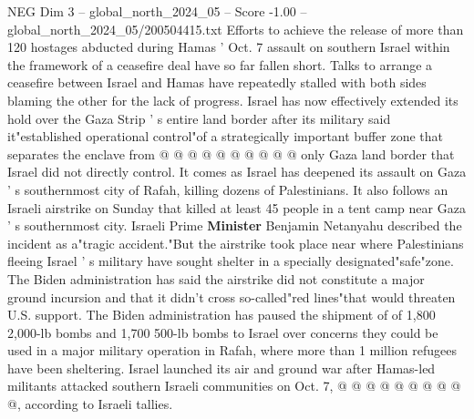 \begin{textsample}{NEG Dim 3 – global\_north\_2024\_05 – Score -1.00 – global\_north\_2024\_05/200504415.txt}
Efforts to achieve the release of more than 120 hostages abducted during Hamas ' Oct. 7 assault on southern Israel within the framework of a ceasefire deal have so far fallen short.
Talks to arrange a ceasefire between Israel and Hamas have repeatedly stalled with both sides blaming the other for the lack of progress.
Israel has now effectively extended its hold over the Gaza Strip ' s entire land border after its military said it"established operational control"of a strategically important buffer zone that separates the enclave from @ @ @ @ @ @ @ @ @ @ only Gaza land border that Israel did not directly control.
It comes as Israel has deepened its assault on Gaza ' s southernmost city of Rafah, killing dozens of Palestinians.
It also follows an Israeli airstrike on Sunday that killed at least 45 people in a tent camp near Gaza ' s southernmost city.
Israeli Prime \textbf{Minister} Benjamin Netanyahu described the incident as a"tragic accident."But the airstrike took place near where Palestinians fleeing Israel ' s military have sought shelter in a specially designated"safe"zone.
The Biden administration has said the airstrike did not constitute a major ground incursion and that it didn't cross so-called"red lines"that would threaten U.S. support.
The Biden administration has paused the shipment of of 1,800 2,000-lb bombs and 1,700 500-lb bombs to Israel over concerns they could be used in a major military operation in Rafah, where more than 1 million refugees have been sheltering.
Israel launched its air and ground war after Hamas-led militants attacked southern Israeli communities on Oct. 7, @ @ @ @ @ @ @ @ @ @, according to Israeli tallies.

\end{textsample}
